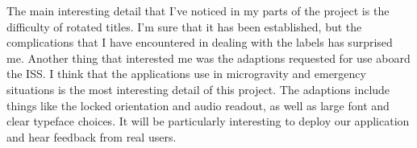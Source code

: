 \documentclass[onecolumn, draftclsnofoot,10pt, compsoc]{IEEEtran}
\begin{document}
The main interesting detail that I've noticed in my parts of the project is the difficulty of rotated titles.
I'm sure that it has been established, but the complications that I have encountered in dealing with the labels has surprised me.
Another thing that interested me was the adaptions requested for use aboard the ISS.
I think that the applications use in microgravity and emergency situations is the most interesting detail of this project.
The adaptions include things like the locked orientation and audio readout, as well as large font and clear typeface choices.
It will be particularly interesting to deploy our application and hear feedback from real users.
%
%
%

\newpage


\end{document}
